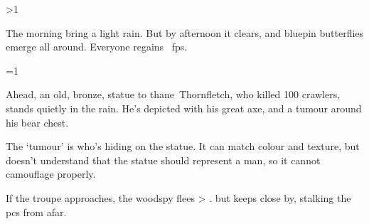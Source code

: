 \ifnum\value{temperature}>1

The morning bring a light rain.
But by afternoon it clears, and bluepin butterflies emerge all around.
Everyone regains ~\glspl{fp}.

\fi

\ifnum\value{cycle}=1
  \begin{boxtext}
    Ahead, an old, bronze, statue to \gls{thane}~Thornfletch, who killed 100 \glspl{crawler}, stands quietly in the rain.
    He's depicted with his great axe, and a tumour around his bear chest.
  \end{boxtext}

  The `tumour' is  who's hiding on the statue.
  It can match colour and texture, but doesn't understand that the statue should represent a man, so it cannot camouflage properly.

  \woodspy

  If the troupe approaches, the \gls{woodspy} flees%
  \ifnum\value{r12}>\value{hp}%
    .
  \else%
    but keeps close by, stalking the \glspl{pc} from afar.
  \fi%
\fi
